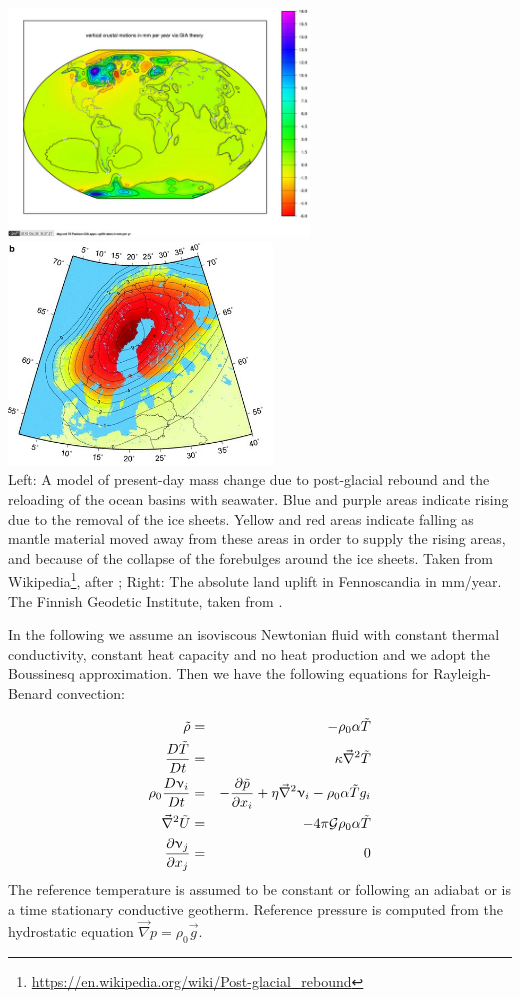 \begin{center}
\includegraphics[width=8cm]{images/chapter_md/pazw07}
\includegraphics[width=7cm]{images/chapter_md/fennoscandia}\\
{\captionfont Left: 
A model of present-day mass change due to post-glacial rebound and the reloading of the 
ocean basins with seawater. Blue and purple areas indicate rising due to the removal of 
the ice sheets. Yellow and red areas indicate falling as mantle material moved away from 
these areas in order to supply the rising areas, and because of the collapse of the forebulges around the ice sheets.
Taken from Wikipedia\footnote{\url{https://en.wikipedia.org/wiki/Post-glacial_rebound}}, after \textcite{pazw07};
Right: The absolute land uplift in Fennoscandia in mm/year. The Finnish Geodetic Institute, taken from \textcite{kakk12}.}
\end{center}

In the following we assume an isoviscous Newtonian fluid with constant thermal
conductivity, constant heat capacity and no heat production and we adopt the Boussinesq
approximation. Then we have the following equations for Rayleigh-Benard convection:

\begin{eqnarray}
{\tilde \rho} &=& -\rho_0 \alpha {\tilde T} \\
\frac{D {\tilde T}}{Dt} &=& \kappa \vec\nabla^2 {\tilde T} \\
\rho_0 \frac{D\upnu_i}{Dt} &=& -\frac{\partial {\tilde p}}{\partial x_i}
+ \eta \vec\nabla^2 \upnu_i - \rho_0 \alpha {\tilde T} g_i \\
\vec\nabla^2 {\tilde U} &=& -4 \pi {\cal G} \rho_0 \alpha {\tilde T} \\
\frac{\partial \upnu_j}{\partial x_j} &=& 0
\end{eqnarray}
The reference temperature is assumed to be constant or following an adiabat or is a time
stationary conductive geotherm. Reference pressure is computed from the hydrostatic
equation $\vec\nabla p = \rho_0 \vec{g}$.

